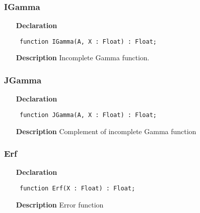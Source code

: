 \documentclass[12pt,a4paper,oneside]{report}
\newcommand{\declarationitem}[1]{\textbf{#1}}
\newcommand{\descriptiontitle}[1]{\textbf{#1}}
\newcommand{\code}[1]{\texttt{#1}}
\begin{document}
\subsubsection{IGamma}
\label{uigamma-IGamma}
\begin{itemize}\item[\declarationitem{Declaration}\hfill]
	\begin{flushleft}
		\code{
			function IGamma(A, X : Float) : Float;}
		
	\end{flushleft}
	
	\par
	\item[\descriptiontitle{Description}]
	Incomplete Gamma function.
	
\end{itemize}
\subsubsection{JGamma}
\label{uigamma-JGamma}
\begin{itemize}\item[\declarationitem{Declaration}\hfill]
	\begin{flushleft}
		\code{
			function JGamma(A, X : Float) : Float;}
		
	\end{flushleft}
	
	\par
	\item[\descriptiontitle{Description}]
	Complement of incomplete Gamma function
	
\end{itemize}
\subsubsection{Erf}
\label{uigamma-Erf}
\begin{itemize}\item[\declarationitem{Declaration}\hfill]
	\begin{flushleft}
		\code{
			function Erf(X : Float) : Float;}
		
	\end{flushleft}
	
	\par
	\item[\descriptiontitle{Description}]
	Error function
	
\end{itemize}
\end{document}
